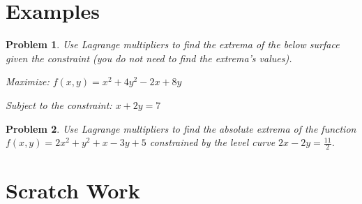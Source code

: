 \documentclass[11pt]{article}
\newtheorem{problem}{Problem}
\begin{document}
\newpage

\section{Examples}

\begin{problem}
Use Lagrange multipliers to find the extrema of the below surface given the constraint (you do not need to find the extrema's values).

\vspace{.25cm}

Maximize: $f(x,y) = x^2 + 4y^2 - 2x +8y$

\vspace{.25cm}

Subject to the constraint: $x + 2y = 7$
\end{problem}


\newpage

\begin{problem} Use Lagrange multipliers to find the absolute extrema of the function $f(x,y) = 2x^2 + y^2+x-3y+5$ constrained by the level curve $2x-2y=\frac{11}{2}$.
\end{problem}


\newpage

\section{Scratch Work}
\end{document}
